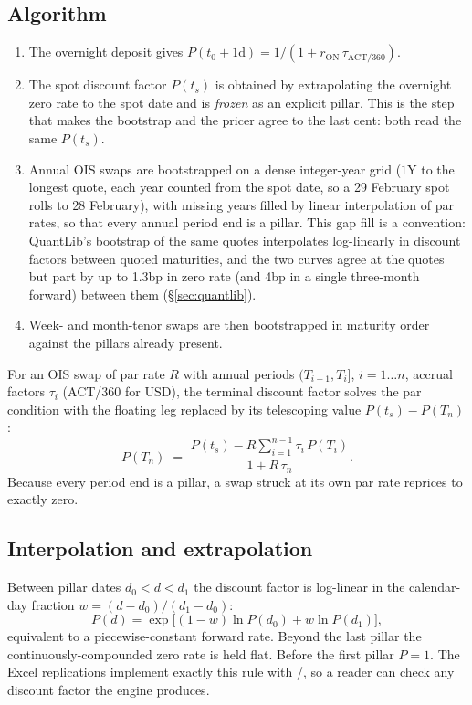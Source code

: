 \documentclass[11pt,a4paper]{article}
\newcommand{\code}[1]{\ifmmode\text{\small\texttt{\detokenize{#1}}}\else{\small\path{#1}}\fi}
\let\plainsubsection\subsection
\renewcommand{\subsection}{\needspace{5\baselineskip}\plainsubsection}
\begin{document}
\subsection{Algorithm}
\begin{enumerate}[leftmargin=1.4em]
\item The overnight deposit gives $P(t_0+1\mathrm{d}) = 1/(1 + r_{\mathrm{ON}}\,\tau_{\mathrm{ACT}/360})$.
\item The spot discount factor $P(t_s)$ is obtained by extrapolating the overnight zero rate to the spot date and is \emph{frozen} as an explicit pillar. This is the step that makes the bootstrap and the pricer agree to the last cent: both read the same $P(t_s)$.
\item Annual OIS swaps are bootstrapped on a dense integer-year grid ($1$Y to the longest quote, each year counted from the spot date, so a 29 February spot rolls to 28 February), with missing years filled by linear interpolation of par rates, so that every annual period end is a pillar. This gap fill is a convention: QuantLib's bootstrap of the same quotes interpolates log-linearly in discount factors between quoted maturities, and the two curves agree at the quotes but part by up to 1.3bp in zero rate (and 4bp in a single three-month forward) between them (\S\ref{sec:quantlib}).
\item Week- and month-tenor swaps are then bootstrapped in maturity order against the pillars already present.
\end{enumerate}
For an OIS swap of par rate $R$ with annual periods $(T_{i-1},T_i]$, $i=1\dots n$, accrual factors $\tau_i$ (ACT/360 for USD), the terminal discount factor solves the par condition with the floating leg replaced by its telescoping value $P(t_s)-P(T_n)$:
\begin{equation}
P(T_n) \;=\; \frac{P(t_s) - R\sum_{i=1}^{n-1}\tau_i\,P(T_i)}{1 + R\,\tau_n}.
\label{eq:ois-boot}
\end{equation}
Because every period end is a pillar, a swap struck at its own par rate reprices to exactly zero.

\subsection{Interpolation and extrapolation}
Between pillar dates $d_0<d<d_1$ the discount factor is log-linear in the calendar-day fraction $w=(d-d_0)/(d_1-d_0)$:
\begin{equation}
P(d) = \exp\big[(1-w)\ln P(d_0) + w\ln P(d_1)\big],
\end{equation}
equivalent to a piecewise-constant forward rate. Beyond the last pillar the continuously-compounded zero rate is held flat. Before the first pillar $P=1$. The Excel replications implement exactly this rule with \code{MATCH}/\code{INDEX}, so a reader can check any discount factor the engine produces.
\end{document}

